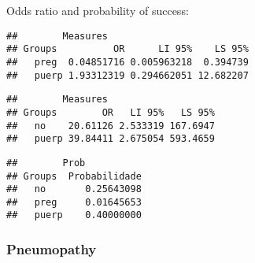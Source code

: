 \documentclass[
]{article}
\newenvironment{Shaded}{\begin{snugshade}}{\end{snugshade}}
\newcommand{\CommentTok}[1]{\textcolor[rgb]{0.56,0.35,0.01}{\textit{#1}}}
\newcommand{\KeywordTok}[1]{\textcolor[rgb]{0.13,0.29,0.53}{\textbf{#1}}}
\newcommand{\NormalTok}[1]{#1}
\newcommand{\OperatorTok}[1]{\textcolor[rgb]{0.81,0.36,0.00}{\textbf{#1}}}
\newcommand{\StringTok}[1]{\textcolor[rgb]{0.31,0.60,0.02}{#1}}
\begin{document}
Odds ratio and probability of success:

\begin{Shaded}
\end{Shaded}

\begin{verbatim}
##        Measures
## Groups          OR      LI 95%    LS 95%
##   preg  0.04851716 0.005963218  0.394739
##   puerp 1.93312319 0.294662051 12.682207
\end{verbatim}

\begin{Shaded}
\end{Shaded}

\begin{verbatim}
##        Measures
## Groups        OR   LI 95%   LS 95%
##   no    20.61126 2.533319 167.6947
##   puerp 39.84411 2.675054 593.4659
\end{verbatim}

\begin{Shaded}
\end{Shaded}

\begin{verbatim}
##        Prob
## Groups  Probabilidade
##   no       0.25643098
##   preg     0.01645653
##   puerp    0.40000000
\end{verbatim}

\hypertarget{pneumopathy-1}{%
\subsubsection{Pneumopathy}\label{pneumopathy-1}}

\begin{Shaded}
\end{Shaded}
\end{document}
